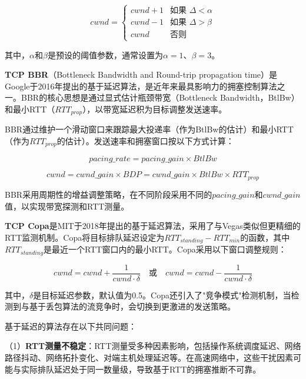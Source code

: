 \begin{equation}
cwnd = \begin{cases}
cwnd + 1 & \text{如果 } \Delta < \alpha \\
cwnd - 1 & \text{如果 } \Delta > \beta \\
cwnd & \text{否则}
\end{cases}
\end{equation}

其中，$\alpha$和$\beta$是预设的阈值参数，通常设置为$\alpha = 1$、$\beta = 3$。

\textbf{TCP BBR}（Bottleneck Bandwidth and Round-trip propagation time）是Google于2016年提出的基于延迟算法，是近年来最具影响力的拥塞控制算法之一。BBR的核心思想是通过显式估计瓶颈带宽（Bottleneck Bandwidth，BtlBw）和最小RTT（$RTT_{prop}$），以带宽延迟积为目标调整发送速率。

BBR通过维护一个滑动窗口来跟踪最大投递率（作为BtlBw的估计）和最小RTT（作为$RTT_{prop}$的估计）。发送速率和拥塞窗口按以下方式计算：

\begin{equation}
pacing\_rate = pacing\_gain \times BtlBw
\end{equation}

\begin{equation}
cwnd = cwnd\_gain \times BDP = cwnd\_gain \times BtlBw \times RTT_{prop}
\end{equation}

BBR采用周期性的增益调整策略，在不同阶段采用不同的$pacing\_gain$和$cwnd\_gain$值，以实现带宽探测和RTT测量。

\textbf{TCP Copa}是MIT于2018年提出的基于延迟算法，采用了与Vegas类似但更精细的RTT监测机制。Copa将目标排队延迟设定为$RTT_{standing} - RTT_{min}$的函数，其中$RTT_{standing}$是最近一个RTT窗口内的最小RTT。Copa采用以下窗口调整规则：

\begin{equation}
cwnd = cwnd + \frac{1}{cwnd \cdot \delta} \quad \text{或} \quad cwnd = cwnd - \frac{1}{cwnd \cdot \delta}
\end{equation}

其中，$\delta$是目标延迟参数，默认值为0.5。Copa还引入了"竞争模式"检测机制，当检测到与基于丢包算法的流竞争时，会切换到更激进的发送策略。

基于延迟的算法存在以下共同问题：

（1）\textbf{RTT测量不稳定}：RTT测量受多种因素影响，包括操作系统调度延迟、网络路径抖动、网络拓扑变化、对端主机处理延迟等。在高速网络中，这些干扰因素可能与实际排队延迟处于同一数量级，导致基于RTT的拥塞推断不可靠。

